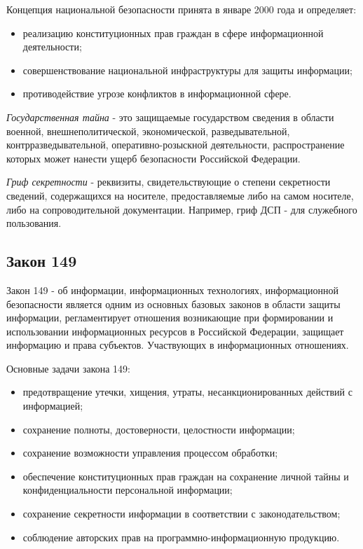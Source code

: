 \documentclass{article}
\begin{document}
Концепция национальной безопасности принята в январе 2000 года и определяет:
\begin{itemize}
\item реализацию конституционных прав граждан в сфере информационной деятельности;
\item совершенствование национальной инфраструктуры для защиты информации;
\item противодействие угрозе конфликтов в информационной сфере.
\end{itemize}

\textit{Государственная тайна} - это защищаемые государством сведения в области военной, внешнеполитической, экономической, разведывательной, контрразведывательной, оперативно-розыскной деятельности, распространение которых может нанести ущерб безопасности Российской Федерации.

\textit{Гриф секретности} - реквизиты, свидетельствующие о степени секретности сведений, содержащихся на носителе, предоставляемые либо на самом носителе, либо на сопроводительной документации. Например, гриф ДСП - для служебного пользования.

\subsection{ Закон 149 }
Закон 149 - об информации, информационных технологиях, информационной безопасности является одним из основных базовых законов в области защиты информации, регламентирует отношения возникающие при формировании и использовании информационных ресурсов в Российской Федерации, защищает информацию и права субъектов. Участвующих в информационных отношениях.

Основные задачи закона 149:
\begin{itemize}
\item предотвращение утечки, хищения, утраты, несанкционированных действий с информацией;
\item сохранение полноты, достоверности, целостности информации;
\item сохранение возможности управления процессом обработки;
\item обеспечение конституционных прав граждан на сохранение личной тайны и конфиденциальности персональной информации;
\item сохранение секретности информации в соответствии с законодательством;
\item соблюдение авторских прав на программно-информационную продукцию.
\end{itemize}
\end{document}
